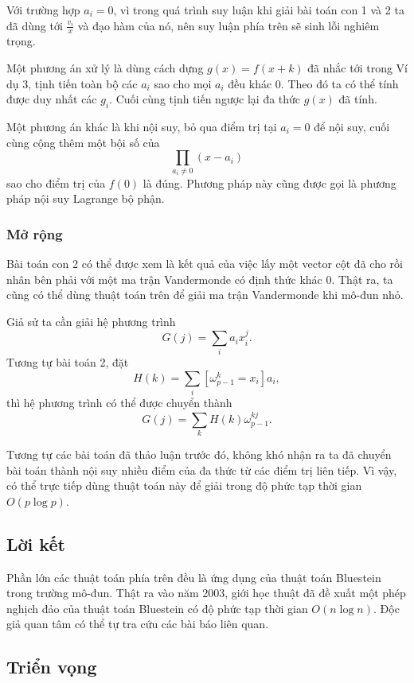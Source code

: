 \documentclass[11pt]{article}
\begin{document}
Với trường hợp \(a_i=0\), vì trong quá trình suy luận khi giải bài toán con 1
và 2 ta đã dùng tới \(\frac{v_i}{x}\) và đạo hàm của nó, nên suy luận phía trên
sẽ sinh lỗi nghiêm trọng.

Một phương án xử lý là dùng cách dựng \(g(x)=f(x+k)\) đã nhắc tới trong Ví dụ
3, tịnh tiến toàn bộ các \(a_i\) sao cho mọi \(a_i\) đều khác \(0\). Theo đó ta
có thể tính được duy nhất các \(g_i\). Cuối cùng tịnh tiến ngược lại đa thức
\(g(x)\) đã tính.

Một phương án khác là khi nội suy, bỏ qua điểm trị tại \(a_i=0\) để nội suy,
cuối cùng cộng thêm một bội số của
\[
\prod_{a_i\ne 0}(x-a_i)
\]
sao cho điểm trị của \(f(0)\) là đúng. Phương pháp này cũng được gọi là phương
pháp nội suy Lagrange bộ phận.

\subsubsection{Mở rộng}

Bài toán con 2 có thể được xem là kết quả của việc lấy một vector cột đã cho
rồi nhân bên phải với một ma trận Vandermonde có định thức khác \(0\). Thật ra,
ta cũng có thể dùng thuật toán trên để giải ma trận Vandermonde khi mô-đun nhỏ.

Giả sử ta cần giải hệ phương trình
\[
G(j)=\sum_i a_i x_i^j.
\]
Tương tự bài toán 2, đặt
\[
H(k)=\sum_i[\omega_{p-1}^k=x_i]a_i,
\]
thì hệ phương trình có thể được chuyển thành
\[
G(j)=\sum_k H(k)\omega_{p-1}^{kj}.
\]

Tương tự các bài toán đã thảo luận trước đó, không khó nhận ra ta đã chuyển bài
toán thành nội suy nhiều điểm của đa thức từ các điểm trị liên tiếp. Vì vậy, có
thể trực tiếp dùng thuật toán này để giải trong độ phức tạp thời gian
\(O(p\log p)\).

\subsection{Lời kết}

Phần lớn các thuật toán phía trên đều là ứng dụng của thuật toán Bluestein
trong trường mô-đun. Thật ra vào năm 2003, giới học thuật đã đề xuất một phép
nghịch đảo của thuật toán Bluestein có độ phức tạp thời gian \(O(n\log n)\).
Độc giả quan tâm có thể tự tra cứu các bài báo liên quan.

\subsection{Triển vọng}
\end{document}
